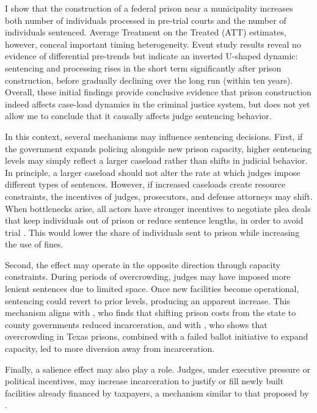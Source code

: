 I show that the construction of a federal prison near a municipality increases both number of individuals processed in pre-trial courts and the number of individuals sentenced. Average Treatment on the Treated (ATT) estimates, however, conceal important timing heterogeneity. Event study results reveal no evidence of differential pre-trends but indicate an inverted U-shaped dynamic: sentencing and processing rises in the short term significantly after prison construction, before gradually declining over the long run (within ten years). Overall, these initial findings provide conclusive evidence that prison construction indeed affects case-load dynamics in the criminal justice system, but does not yet allow me to conclude that it causally affects judge sentencing behavior.

In this context, several mechanisms may influence sentencing decisions. First, if the government expands policing alongside new prison capacity, higher sentencing levels may simply reflect a larger caseload rather than shifts in judicial behavior. In principle, a larger caseload should not alter the rate at which judges impose different types of sentences. However, if increased caseloads create resource constraints, the incentives of judges, prosecutors, and defense attorneys may shift. When bottlenecks arise, all actors have stronger incentives to negotiate plea deals that keep individuals out of prison or reduce sentence lengths, in order to avoid trial \citep{Yang-Resource-AEJ}. This would lower the share of individuals sent to prison while increasing the use of fines.

Second, the effect may operate in the opposite direction through capacity constraints. During periods of overcrowding, judges may have imposed more lenient sentences due to limited space. Once new facilities become operational, sentencing could revert to prior levels, producing an apparent increase. This mechanism aligns with \cite{Ouss-Incentives}, who finds that shifting prison costs from the state to county governments reduced incarceration, and with \cite{Schnepel}, who shows that overcrowding in Texas prisons, combined with a failed ballot initiative to expand capacity, led to more diversion away from incarceration.

Finally, a salience effect may also play a role. Judges, under executive pressure or political incentives, may increase incarceration to justify or fill newly built facilities already financed by taxpayers, a mechanism similar to that proposed by \cite{Dippel}.

